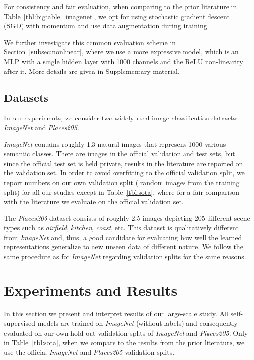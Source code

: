 \documentclass[10pt,twocolumn,letterpaper]{article}
\begin{document}
For consistency and fair evaluation, when comparing to the prior literature in Table~\ref{tbl:bigtable_imagenet}, we opt for using stochastic gradient descent (SGD) with momentum and use data augmentation during training.

We further investigate this common evaluation scheme in Section~\ref{subsec:nonlinear}, where we use a more expressive model, which is an MLP with a single hidden layer with 1000 channels and the ReLU non-linearity after it.
More details are given in Supplementary material.



\subsection{Datasets}\label{subsec:datasets}

In our experiments, we consider two widely used  image classification datasets: \emph{ImageNet} and \emph{Places205}.


\emph{ImageNet} contains roughly \SI{1.3}{} natural images that represent 1000 various semantic classes.
There are  images in the official validation and test sets, but since the official test set is held private, results in the literature are reported on the validation set.
In order to avoid overfitting to the official validation split, we report numbers on our own validation split ( random images from the training split) for all our studies except in Table~\ref{tbl:sota}, where for a fair comparison with the literature we evaluate on the official validation set.


The \emph{Places205} dataset consists of roughly \SI{2.5}{} images depicting 205 different scene types such as \emph{airfield}, \emph{kitchen}, \emph{coast}, etc.
This dataset is qualitatively different from \emph{ImageNet} and, thus, a good candidate for evaluating how well the learned representations generalize to new unseen data of different nature.
We follow the same procedure as for \emph{ImageNet} regarding validation splits for the same reasons.


\section{Experiments and Results}\label{sec:core}

In this section we present and interpret results of our large-scale study.
All self-supervised models are trained on \emph{ImageNet}  (without labels) and consequently evaluated on our own hold-out validation splits of \emph{ImageNet} and \emph{Places205}.
Only in Table~\ref{tbl:sota}, when we compare to the results from the prior literature, we use the official \emph{ImageNet} and \emph{Places205} validation splits.
\end{document}
